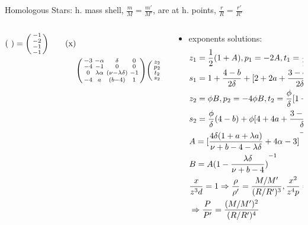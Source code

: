 \begin{frame}{Homologous Stars: h. mass shell, $\frac{m}{M}=\frac{m'}{M'}$, are at h. points, $\frac{r}{R}=\frac{r'}{R'}$}
\begin{columns}[T]
\begin{column}{0.50\textwidth}
\begin{align*}
\begin{psmallmatrix}
            \end{psmallmatrix}=\begin{psmallmatrix}
                -1\\-2\\-1\\-1\\
            \end{psmallmatrix}\tag{x}\\
            &\begin{psmallmatrix}\setlength\arraycolsep{-10pt}
                -3&-\alpha&\delta&0\\
                -4&-1&0&0\\
                0&\lambda\alpha&(\nu-\lambda\delta)&-1\\
                -4&a&(b-4)&1\\
            \end{psmallmatrix}
            \begin{psmallmatrix}
                z_2\\p_2\\t_2\\s_2\\
            \end{psmallmatrix}=\begin{psmallmatrix}
               \phi\\0\\-\lambda\phi\\0\\
            \end{psmallmatrix}\tag{y}
             \end{align*}
        \end{column}
        \begin{column}{0.50\textwidth}
            \begin{itemize}
                \item exponents solutions:
    \begin{align*}
            &z_1=\frac{1}{2}(1+A),p_1=-2A,t_1=\frac{1}{2\delta}[1+(3-4\alpha)A],\\
            &s_1=1+\frac{4-b}{2\delta}+[2+2a+\frac{3-4\alpha}{2\delta}(4-b)]A\\
            &z_2=\phi B,p_2=-4\phi B,t_2=\frac{\phi}{\delta}[1+(3-4\alpha)B],\\
            &s_2=\frac{\phi}{\delta}(4-b)+\phi[4+4a+\frac{3-4\alpha}{\delta}(4-b)]B\\
            &A={[\frac{4\delta(1+a+\lambda a)}{\nu+b-4-\lambda\delta}+4\alpha-3]}^{-1},\\
            &B=A{(1-\frac{\lambda\delta}{\nu+b-4})}^{-1}\\
            &\frac{x}{z^3d}=1\Rightarrow \frac{\rho}{\rho'}=\frac{M/M'}{(R/R')^3},\frac{x^2}{z^4p}=1\\
            &\Rightarrow \frac{P}{P'}=\frac{(M/M')^2}{(R/R')^4}
    \end{align*}
    

\end{itemize}
\end{column}
\end{columns}
\end{frame}
